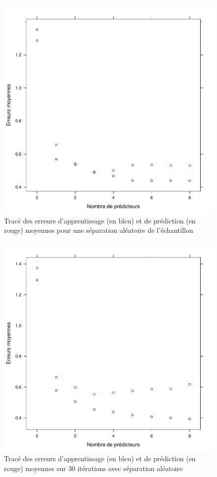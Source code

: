 \documentclass[a4paper, 12pt]{article}
\begin{document}
\begin{enumerate}
\begin{figure}
\begin{center}
\includegraphics[scale=1]{erreurs_moy_autre.pdf}
\caption{Tracé des erreurs d'apprentissage (en bleu) et de prédiction (en rouge) moyennes pour une séparation aléatoire de l'échantillon}
\end{center}
\end{figure}

\begin{figure}
\begin{center}
\includegraphics[scale=1]{erreurs_moy_moy.pdf}
\caption{Tracé des erreurs d'apprentissage (en bleu) et de prédiction (en rouge) moyennes sur 30 itérations avec séparation aléatoire}
\end{center}
\end{figure}


\end{enumerate}
\end{document}
